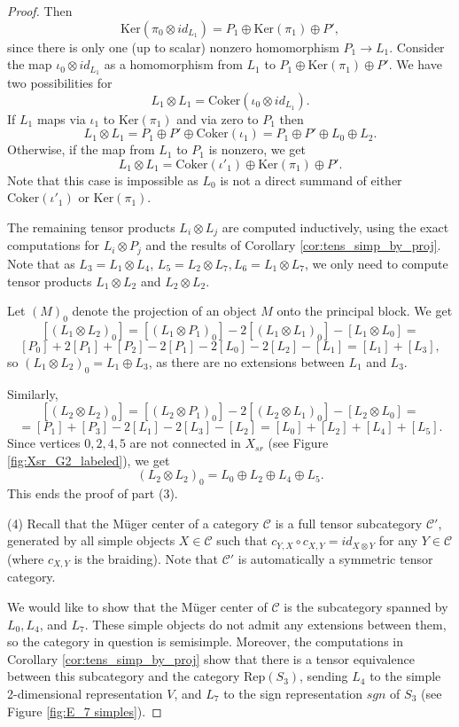 \documentclass{amsart}
\theoremstyle{definition}
\newcommand{\C}{\mathcal{C}}
\newcommand{\Rep}{\text{Rep}}
\numberwithin{equation}{section}
\begin{document}
\begin{proof}
    Then
    $$
    \mathrm{Ker}(\pi_0\otimes id_{L_1})=P_1\oplus \mathrm{Ker}(\pi_1)\oplus P',
    $$
    since there is only one (up to scalar) nonzero homomorphism $P_1\to L_1$. Consider the map $\iota_0\otimes id_{L_1}$ as a homomorphism from $L_1$ to $P_1\oplus \mathrm{Ker}(\pi_1)\oplus P'$. We have two possibilities for
    $$
    L_1\otimes L_1 = \mathrm{Coker}(\iota_0\otimes id_{L_1}).
    $$
    If $L_1$ maps via $\iota_1$ to $\mathrm{Ker}(\pi_1)$ and via zero to $P_1$ then 
    $$
    L_1\otimes L_1 = P_1\oplus P'\oplus \mathrm{Coker}(\iota_1) = P_1\oplus P'\oplus L_0\oplus L_2.
    $$
    Otherwise, if the map from $L_1$ to $P_1$ is nonzero, we get
    $$
    L_1\otimes L_1 = \mathrm{Coker}(\iota'_1) \oplus \mathrm{Ker}(\pi_1) \oplus P'.
    $$
    Note that this case is impossible as $L_0$ is not a direct summand of either $\mathrm{Coker}(\iota'_1)$ or $\mathrm{Ker}(\pi_1)$.
    
    The remaining tensor products $L_i\otimes L_j$ are computed inductively, using the exact computations for $L_i\otimes P_j$ and the results of Corollary \ref{cor:tens_simp_by_proj}.  Note that as $L_3=L_1\otimes L_4$, $L_5=L_2\otimes L_7, L_6=L_1\otimes L_7$, we only need to compute  tensor products $L_1\otimes L_2$ and $L_2\otimes L_2$.

    Let $(M)_0$ denote the projection of an object $M$ onto the principal block. We get
    $$
    [(L_1\otimes L_2)_0]=[(L_1\otimes P_1)_0]-2[(L_1\otimes L_1)_0]-[L_1\otimes L_0] = 
    $$
    $$
    [P_0]+2[P_1]+[P_2]-2[P_1]-2[L_0]-2[L_2]-[L_1] = [L_1]+[L_3],
    $$
    so  $(L_1\otimes L_2)_0 =L_1\oplus L_3$, as there are no extensions between $L_1$ and $L_3$. 

    Similarly,
    $$
    [(L_2\otimes L_2)_0] = [(L_2\otimes P_1)_0]-2[(L_2\otimes L_1)_0] - [L_2\otimes L_0] =
    $$
    $$
    = [P_1]+[P_3] - 2[L_1]-2[L_3] - [L_2] = [L_0]+[L_2]+[L_4]+[L_5].
    $$
    Since vertices $0,2,4,5$ are not connected in $X_{sr}$ (see Figure \ref{fig:Xsr_G2_labeled}), we get 
    $$
    (L_2\otimes L_2)_0 = L_0\oplus L_2\oplus L_4\oplus L_5.
    $$
    This ends the proof of part (3).

(4) Recall that the M\"uger center of a category $\C$ is a full tensor subcategory $\C'$, generated by all simple objects $X\in \C$ such that $c_{Y,X}\circ c_{X,Y} = id_{X\otimes Y}$ for any $Y\in \C$ (where $c_{X,Y}$ is the braiding). Note that $\C'$ is automatically a symmetric tensor category.

We would like to show that the M\"uger center of $\C$ is the subcategory spanned by $L_0, L_4$, and $L_7$. These simple objects do not admit any extensions between them, so the category in question is semisimple. Moreover, the computations in Corollary \ref{cor:tens_simp_by_proj} show that there is a tensor equivalence between this subcategory and the category $\Rep (S_3)$, sending $L_4$ to the simple 2-dimensional representation $V$, and $L_7$ to the sign representation $sgn$ of $S_3$ (see Figure \ref{fig:E_7 simples}).


\end{proof}
\end{document}

